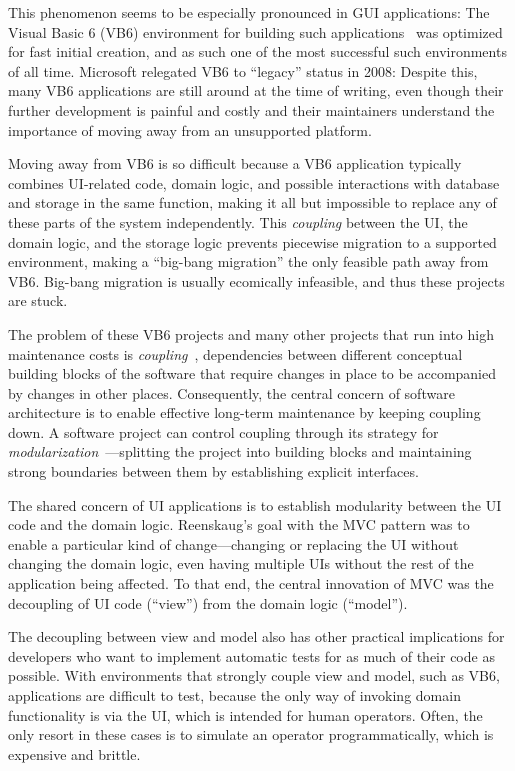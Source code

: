 \documentclass[sigplan,screen]{acmart}
\begin{document}
This phenomenon seems to be especially pronounced in GUI applications:
The Visual Basic 6 (VB6) environment for building such
applications~\cite{VB6} was optimized for fast initial creation, and
as such one of the most successful such environments of all time.
Microsoft relegated VB6 to ``legacy'' status in 2008: Despite this,
many VB6 applications are still around at the time of writing, even
though their further development is painful and costly and their
maintainers understand the importance of moving away from an
unsupported platform.

Moving away from VB6 is so difficult because a VB6 application
typically combines UI-related code, domain logic, and possible
interactions with database and storage in the same function, making it
all but impossible to replace any of these parts of the system
independently.  This \textit{coupling} between the UI, the domain
logic, and the storage logic prevents piecewise migration to a
supported environment, making a ``big-bang migration'' the only
feasible path away from VB6.  Big-bang migration is usually ecomically
infeasible, and thus these projects are stuck.

The problem of these VB6 projects and many other projects that run
into high maintenance costs is \textit{coupling}~\cite{GreenBook},
dependencies between different conceptual building blocks of the
software that require changes in place to be accompanied by changes in
other places.  Consequently, the central concern of software
architecture is to enable effective long-term maintenance by keeping
coupling down.  A software project can control coupling through its
strategy for \textit{modularization}~\cite{Modularity}---splitting the
project into building blocks and maintaining strong boundaries between
them by establishing explicit interfaces.

The shared concern of UI applications is to establish modularity
between the UI code and the domain logic.  Reenskaug's goal with the
MVC pattern was to enable a particular kind of change---changing or
replacing the UI without changing the domain logic, even having
multiple UIs without the rest of the application being affected.  To
that end, the central innovation of MVC was the decoupling of UI code
(``view'') from the domain logic (``model'').

The decoupling between view and model also has other practical
implications for developers who want to implement automatic tests for
as much of their code as possible.  With environments that strongly
couple view and model, such as VB6, applications are difficult to
test, because the only way of invoking domain functionality is via the
UI, which is intended for human operators.  Often, the only resort in
these cases is to simulate an operator programmatically, which is
expensive and brittle.
\end{document}
